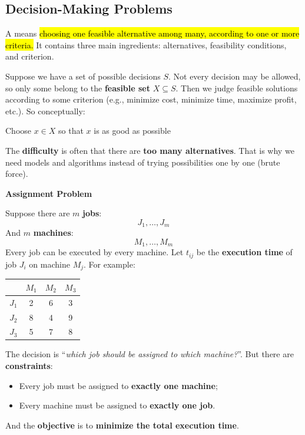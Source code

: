 \subsection{Decision-Making Problems}\label{sec:introduction:decision-making-problems}

A  means \hl{choosing one feasible alternative among many, according to one or more criteria.} It contains three main ingredients: alternatives, feasibility conditions, and criterion.

\highspace
Suppose we have a set of possible decisions $S$. Not every decision may be allowed, so only some belong to the \textbf{feasible set} $X \subseteq S$. Then we judge feasible solutions according to some criterion (e.g., minimize cost, minimize time, maximize profit, etc.). So conceptually:
\begin{center}
    Choose $x \in X$ so that $x$ is as good as possible
\end{center}
The \textbf{difficulty} is often that there are \textbf{too many alternatives}. That is why we need models and algorithms instead of trying possibilities one by one (brute force).

\highspace
\begin{flushleft}
    \textcolor{Red2}{ \textbf{Assignment Problem}}
\end{flushleft}
Suppose there are $m$ \textbf{jobs}:
\begin{equation*}
    J_1, \dots, J_m
\end{equation*}
And $m$ \textbf{machines}:
\begin{equation*}
    M_1, \dots, M_m
\end{equation*}
Every job can be executed by every machine. Let $t_{ij}$ be the \textbf{execution time} of job $J_i$ on machine $M_j$. For example:
\begin{center}
    \begin{tabular}{@{} c | c c c @{}}
        \toprule
        & $M_1$ & $M_2$ & $M_3$ \\
        \midrule
        $J_1$ & 2 & 6 & 3 \\
        $J_2$ & 8 & 4 & 9 \\
        $J_3$ & 5 & 7 & 8 \\
        \bottomrule
    \end{tabular}
\end{center}
\noindent
The decision is ``\emph{which job should be assigned to which machine?}''. But there are \textbf{constraints}:
\begin{itemize}
    \item Every job must be assigned to \textbf{exactly one machine};
    \item Every machine must be assigned to \textbf{exactly one job}.
\end{itemize}
And the \textbf{objective} is to \textbf{minimize the total execution time}.

